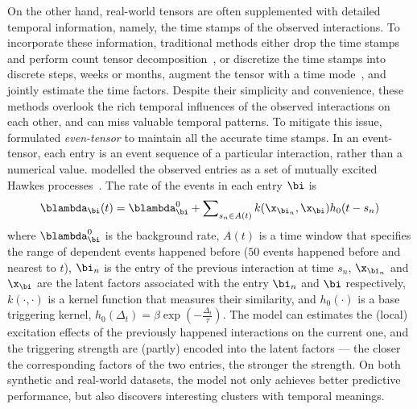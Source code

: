 On the other hand, real-world tensors are often supplemented with detailed temporal information, namely, the time stamps of the observed interactions.
To incorporate these information, traditional methods either  drop the time stamps  and perform count tensor decomposition~\citep{chi2012tensors, Hu2015CountTensor}, or  discretize the time stamps into discrete steps, \eg weeks or months,  augment the tensor with a time mode~\citep{xiong2010temporal, schein2015bayesian, Schein:2016:BPT:3045390.3045686}, and jointly estimate the time factors.  
Despite their simplicity and convenience, these methods overlook the rich temporal influences of the observed interactions on each other, and can miss valuable temporal patterns. To mitigate this issue, \citet{zhe2018stochastic} formulated \textit{even-tensor} to maintain all the accurate time stamps. In an event-tensor, each entry is an event sequence of a particular interaction, rather than a numerical value. \citet{zhe2018stochastic} modelled the observed entries as a set of mutually excited Hawkes processes~\citep{hawkes1971spectra}. The rate of the events in each entry  $\bi$ is%
\begin{align}
\blambda_\bi(t) = \blambda_\bi^0 + \sum\nolimits_{s_n \in A(t)} k(\x_{\bi_n},\x_{\bi})h_0(t-s_n) \notag
\end{align}
where $\blambda_\bi^0$ is the background rate, $A(t)$ is a time window that specifies the range of dependent events happened before (\eg  $50$ events happened before and nearest to $t$), $\bi_n$ is the entry of the previous interaction at time $s_n$, $\x_{\bi_n}$ and $\x_{\bi}$ are the latent factors associated with the entry $\bi_n$ and $\bi$ respectively, $k(\cdot, \cdot)$ is a kernel function that measures their similarity, and $h_0(\cdot)$ is a base triggering kernel,  \eg $h_0(\Delta_t)=\beta\exp(-\frac{\Delta_t}{\tau})$. The model can estimates the (local) excitation effects of the previously happened interactions on the current one, and the triggering strength are (partly) encoded into the latent factors --- the closer the corresponding factors of the two entries, the stronger the strength. On both synthetic and real-world datasets, the model not only achieves better predictive performance, but also discovers interesting clusters with temporal meanings. 
